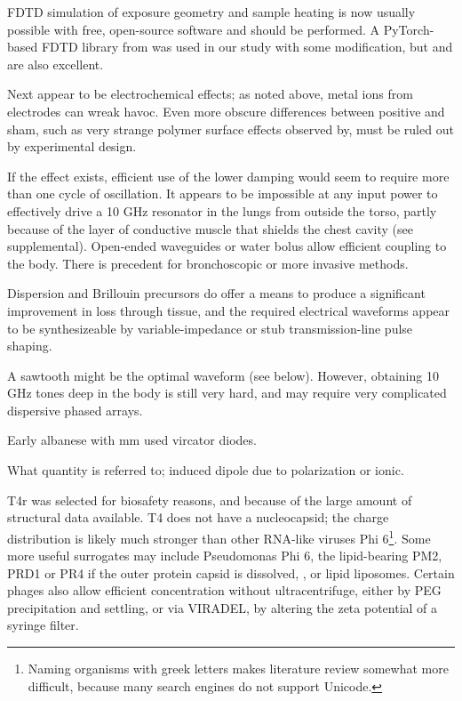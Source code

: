 \documentclass[paper.tex]{subfiles}
\begin{document}
\begin{multicols}{1}
FDTD simulation of exposure geometry and sample heating is now usually possible with free, open-source software and should be performed. A PyTorch-based FDTD library from \cite{Highly2019} was used in our study with some modification, but \cite{CUDAbased2019} and \cite{openEMS} are also excellent. 

Next appear to be electrochemical\cite{Comparative2003} effects; as noted above, metal ions from electrodes can wreak havoc. Even more obscure differences between positive and sham, such as very strange polymer surface effects observed by\cite{Effect1994a}, must be ruled out by experimental design.

If the effect exists, efficient use of the lower damping would seem to require more than one cycle of oscillation. It appears to be impossible at any input power to effectively drive a 10 GHz resonator in the lungs from outside the torso, partly because of the layer of conductive muscle that shields the chest cavity (see supplemental). Open-ended waveguides\cite{OpenEnded1982}\cite{Analysis1989}\cite{142018} or water bolus allow efficient coupling to the body. There is precedent for bronchoscopic \cite{Flexible2019}\cite{Antenna2018} or more invasive methods\cite{Implantable1980}\cite{Implantable1982}\cite{Electromagnetic1983}. 

Dispersion and Brillouin precursors do offer a means to produce a significant improvement in loss through tissue, and the required electrical waveforms appear to be synthesizeable by variable-impedance or stub transmission-line pulse shaping\cite{Coaxial1985}\cite{Arbitrarya}. 

A sawtooth might be the optimal waveform (see below). However, obtaining 10 GHz tones deep in the body is still very hard, and may require very complicated dispersive phased arrays\cite{Microwave1982a}.

Early albanese with mm used vircator diodes. 

What quantity is referred to; induced dipole due to polarization or ionic.

T4r was selected for biosafety reasons, and because of the large amount of structural data available. T4\cite{History1995} does not have a nucleocapsid; the charge distribution is likely much stronger than other RNA-like viruses Phi 6\footnote{Naming organisms with greek letters makes literature review somewhat more difficult, because many search engines do not support Unicode.}. Some more useful surrogates may include Pseudomonas Phi 6\cite{Selection2017}, the lipid-bearing PM2, PRD1 or PR4\cite{Lipidcontaining1979} if the outer protein capsid is dissolved\cite{Bacteriophage2002}, \cite{Dissociation1993}, or lipid liposomes. Certain phages also allow efficient concentration without ultracentrifuge, either by PEG precipitation\cite{Rapid1970} and settling, or via VIRADEL\cite{GROWTH}\cite{Chemical1982}\cite{highly1988}\cite{AdsorptionElution1989}, by altering the zeta potential of a syringe filter. 


\end{multicols}
\end{document}
